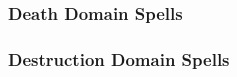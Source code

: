 \subsubsection{Death Domain Spells}

\begin{spelllist}
    \SLinflictwounds[1]
    \SLcurseofbloodandbone[2]
    \SLdeathknell[3]
    \SLenervation[4]
    \SLbleed[5]
    \SLfingerofdeath[6]
    \SLstriptheflesh[7]
    \SLavatarofdeath[8]
    \SLwailofthebanshee[9]
\end{spelllist}

\subsubsection{Destruction Domain Spells}

\begin{spelllist}
    \SLrottinggrasp[1]
    \SLsoundburst[2]
    \SLrotburst[3]
    \SLshout[4]
    \SLflamestrike[5]
    \SLdisintegrate[6]
    \SLicestorm[7]
    \SLfirestorm[8]
    \SLearthquake[9]
\end{spelllist}

\begin{comment}
\subsubsection{Dragon Domain Spells}

\begin{spelllist}
    \spellhead[1]{Burning Hands}\fn{1} 1d6 fire damage.
    \spellhead[1]{Command} One subject obeys selected command for 1 round.
    \spellhead[2]{Locate Object} Senses direction toward object (specific or type).
    \spellhead[3]{Lightning Bolt}\fn{1} Large line of electricity deals 3d8 damage.
    \spellhead[4]{Fly} Subject flies at speed of 60 ft.
    \spellhead[4]{Suggestion} Compels subject to follow stated course of action.
    \spellhead[5]{Cone of Cold}\fn{1} 5d8 cold damage and brief slow in large cone.
    \spellhead[6]{Locate Entity} Locates creatures or objects within 1 mile.
    \spellhead[6]{True Seeing}\M Lets you see all things as they really are.
    \spellhead[7]{Overland Flight} You fly at a speed of 40 ft. and can hustle over long distances.
    \spellhead[7]{Power Word Blind} Blinds bloodied creature.
    \spellhead[8]{Power Word Stun} Stuns bloodied creature.
    \spellhead[9]{Power Word Kill} Kills bloodied creature.
\end{spelllist}
1 Used as a breath attack, requiring no somatic components.
\end{comment}

